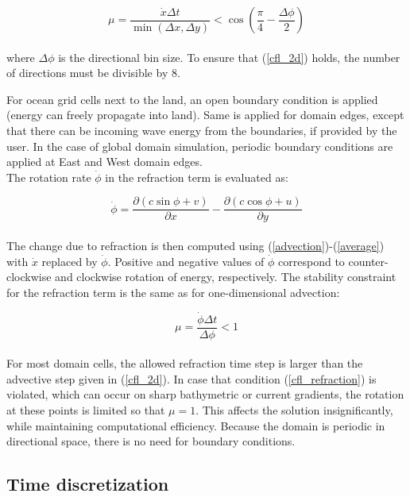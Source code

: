 \documentclass[letterpaper]{article}
\numberwithin{equation}{section}
\begin{document}
\begin{equation}
\mu = \dfrac{\dot{x}\Delta t}{\min{(\Delta x,\Delta y)}} < 
\cos{\left(\dfrac{\pi}{4}
-\dfrac{\Delta \phi}{2}\right)}\label{cfl_2d}
\end{equation}
\\
where $\Delta \phi$ is the directional bin size. 
To ensure that (\ref{cfl_2d}) holds, the number of directions must be divisible by $8$.

For ocean grid cells next to the land, an open boundary condition is applied
(energy can freely propagate into land). Same is applied for domain edges, 
except that there can be incoming wave energy from the boundaries, if provided by the user.
In the case of global domain simulation, periodic boundary conditions are applied at East and West domain edges.
\\
The rotation rate $\dot{\phi}$ in the refraction term is evaluated as:

\begin{equation}
\dot{\phi} = 
\dfrac{\partial (c\sin{\phi}+v)}{\partial x} - 
\dfrac{\partial (c\cos{\phi}+u)}{\partial y}
\end{equation}
\\
The change due to refraction is then computed using (\ref{advection})-(\ref{average}) with $\dot{x}$ replaced by $\dot{\phi}$. 
Positive and negative values of $\dot{\phi}$ correspond to 
counter-clockwise and clockwise rotation of energy, respectively.
The stability constraint for the refraction term is the same as for one-dimensional advection:

\begin{equation}
\mu = \dfrac{\dot{\phi}\Delta t}{\Delta \phi} < 1\label{cfl_refraction}
\end{equation}
\\
For most domain cells, the allowed refraction time step is larger than the advective step given in (\ref{cfl_2d}).
In case that condition (\ref{cfl_refraction}) is violated, which can occur on sharp bathymetric or current gradients,
the rotation at these points is limited so that $\mu = 1$.
This affects the solution insignificantly, while maintaining computational efficiency.
Because the domain is periodic in directional space, there is no need for boundary conditions.

\subsection{Time discretization}
\label{sec:time_discretization}
\end{document}

